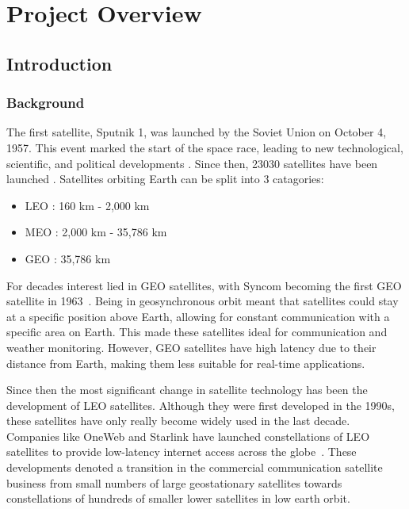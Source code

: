 \section{Project Overview}

\subsection{Introduction}

\subsubsection{Background}

The first satellite, Sputnik 1, was launched by the Soviet Union on October 4, 1957. This event marked the start of the space race, leading to new technological, scientific, and political developments \cite{nasa-sputnik}. Since then, 23030 satellites have been launched \cite{esa-debris}. Satellites orbiting Earth can be split into 3 catagories:

\begin{itemize}
    \item \ac{LEO} : 160 km - 2,000 km

    \item \ac{MEO} : 2,000 km - 35,786 km

    \item \ac{GEO} : 35,786 km
\end{itemize}

For decades interest lied in \ac{GEO} satellites, with Syncom becoming the first \ac{GEO} satellite in 1963~\cite{nasa-syncom}. Being in geosynchronous orbit meant that satellites could stay at a specific position above Earth, allowing for constant communication with a specific area on Earth. This made these satellites ideal for communication and weather monitoring. However, \ac{GEO} satellites have high latency due to their distance from Earth, making them less suitable for real-time applications.

Since then the most significant change in satellite technology has been the development of \ac{LEO} satellites. Although they were first developed in the 1990s, these satellites have only really become widely used in the last decade. Companies like OneWeb and Starlink have launched constellations of \ac{LEO} satellites to provide low-latency internet access across the globe~\cite{reliasat-evolution}. These developments denoted a transition in the commercial communication satellite business from small numbers of large geostationary satellites towards constellations of hundreds of smaller lower satellites in low earth orbit.


